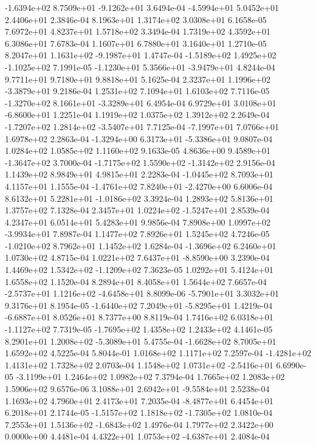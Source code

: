 -1.6394e+02  8.7509e+01 -9.1262e+01  3.6494e-04
-4.5994e+01  5.0452e+01  2.4406e+01  2.3846e-04
8.1963e+01 1.3174e+02 3.0308e+01  6.1658e-05
7.6972e+01 4.8237e+01 1.5718e+02  3.3494e-04
1.7319e+02 4.3592e+01 6.3086e+01  7.6783e-04
1.1607e+01 6.7880e+01 3.1640e+01  1.2710e-05
 8.2047e+01  1.1631e+02 -9.1987e+01  1.4747e-04
-1.5189e+02  1.4925e+02 -1.1025e+02  7.1991e-05
-1.1230e+01  5.3566e+01 -3.9479e+01  4.8244e-04
9.7711e+01 9.7180e+01 9.8818e+01  5.1625e-04
 2.3237e+01  1.1996e+02 -3.3879e+01  9.2186e-04
1.2531e+02 7.1094e+01 1.6103e+02  7.7116e-05
-1.3270e+02  8.1661e+01 -3.3289e+01  6.4954e-04
 6.9729e+01  3.0108e+01 -6.8600e+01  1.2251e-04
1.1919e+02 1.0375e+02 1.3912e+02  2.2649e-04
-1.7207e+02  1.2814e+02 -3.5407e+01  7.7125e-04
-7.1997e+01  7.0766e+01  1.6978e+02  2.2863e-04
-1.3294e+00  6.3173e+01 -5.3386e+01  9.0807e-04
1.0284e+02 1.0585e+02 1.1160e+02  9.1633e-05
 4.8636e+00  9.4589e+01 -1.3647e+02  3.7000e-04
-1.7175e+02  1.5590e+02 -1.3142e+02  2.9156e-04
1.1439e+02 8.9849e+01 4.9815e+01  2.2283e-04
-1.0445e+02  8.7093e+01  4.1157e+01  1.1555e-04
-1.4761e+02  7.8240e+01 -2.4270e+00  6.6006e-04
 8.6132e+01  5.2281e+01 -1.0186e+02  3.3924e-04
1.2893e+02 5.8136e+01 1.3757e+02  7.1328e-04
 2.3457e+01  1.0224e+02 -1.5247e+01  2.8539e-04
4.2347e+01 6.0514e+01 5.4283e+01  9.9856e-04
 7.8908e+00  1.0997e+02 -3.9934e+01  7.8987e-04
1.1477e+02 7.8926e+01 1.5245e+02  4.7246e-05
-1.0210e+02  8.7962e+01  1.1452e+02  1.6284e-04
-1.3696e+02  6.2460e+01  1.0730e+02  4.8715e-04
 1.0221e+02  7.6437e+01 -8.8590e+00  3.2390e-04
 1.4469e+02  1.5342e+02 -1.1209e+02  7.3623e-05
1.0292e+01 5.4124e+01 1.6558e+02  1.1520e-04
8.2894e+01 8.4058e+01 1.5644e+02  7.6657e-04
-2.5737e+01  1.1216e+02 -4.6458e+01  8.8099e-06
-5.7901e+01  3.3032e+01  9.3176e+01  8.1954e-05
-1.6440e+02  7.2049e+01 -5.8295e+01  1.4219e-04
-6.6887e+01  8.0526e+01  8.7377e+00  8.8119e-04
 1.7416e+02  6.0318e+01 -1.1127e+02  7.7319e-05
-1.7695e+02  1.4358e+02  1.2433e+02  4.1461e-05
 8.2901e+01  1.2008e+02 -5.3089e+01  5.4755e-04
-1.6628e+02  8.7005e+01  1.6592e+02  4.5225e-04
5.8044e-01 1.0168e+02 1.1171e+02  7.2597e-04
-1.4281e+02  1.4131e+02  1.7328e+02  2.0703e-04
 1.1548e+02  1.0731e+02 -2.5416e+01  6.6990e-05
-3.1199e+01  1.2464e+02  1.0982e+02  7.3794e-04
1.7665e+02 1.2083e+02 1.5906e+02  9.6576e-06
 3.1088e+01  2.6942e+01 -9.5584e+01  2.5238e-04
1.1693e+02 4.7960e+01 2.4173e+01  7.2035e-04
-8.4877e+01  6.4454e+01  6.2018e+01  2.1744e-05
-1.5157e+02  1.1818e+02 -1.7305e+02  1.0810e-04
 7.2553e+01  1.5136e+02 -1.6843e+02  1.4976e-04
1.7977e+02 2.3422e+00 0.0000e+00  4.4481e-04
 4.4322e+01  1.0753e+02 -4.6387e+01  2.4084e-04
